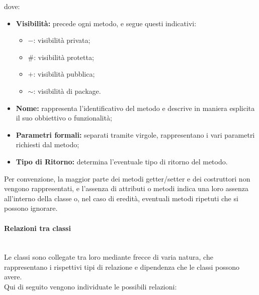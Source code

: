 \documentclass[8pt]{article}
\newcommand{\subsubsubsection}[1]{\paragraph{#1}\mbox{}\\}
\begin{document}
\begin{enumerate}
          dove:\\
          \begin{itemize}
            \item \textbf{Visibilità:} precede ogni metodo, e segue questi indicativi:
                \begin{itemize}
                    \item $-$: visibilità privata;
                    \item $\#$: visibilità protetta;
                    \item $+$: visibilità pubblica;
                    \item $\sim$: visibilità di package. 
                \end{itemize}
            \item \textbf{Nome:} rappresenta l'identificativo del metodo e descrive in maniera esplicita il suo obbiettivo o funzionalità;
            \item \textbf{Parametri formali:} separati tramite virgole, rappresentano i vari parametri richiesti dal metodo;
            \item \textbf{Tipo di Ritorno:} determina l'eventuale tipo di ritorno del metodo.
            \end{itemize}
    \end{enumerate}
        Per convenzione, la maggior parte dei metodi getter/setter e dei costruttori non vengono rappresentati, e l'assenza di attributi o metodi indica una loro assenza all'interno della classe o, nel caso di eredità, eventuali metodi ripetuti che si possono ignorare.  
 \subsubsubsection{Relazioni tra classi}
 Le classi sono collegate tra loro mediante frecce di varia natura, che rappresentano i rispettivi tipi di relazione e dipendenza che le classi possono avere.\\
 Qui di seguito vengono individuate le possibili relazioni:
         \clearpage
\end{document}
